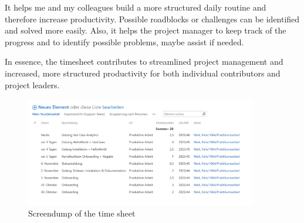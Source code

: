 It helps me and my colleagues build a more structured daily routine and therefore increase productivity. Possible roadblocks or challenges can be identified and solved more easily.
Also, it helps the project manager to keep track of the progress and to identify possible problems, maybe assist if needed.

In essence, the timesheet contributes to streamlined project management and increased, more structured productivity for both individual contributors and project leaders.

\begin{figure}[h]
    \centering
    \includegraphics[width=0.9\textwidth]{figures/onboarding/stundenzettel_screendump.png}
    \caption{Screendump of the time sheet}
    \label{fig:time_sheet}
\end{figure}

